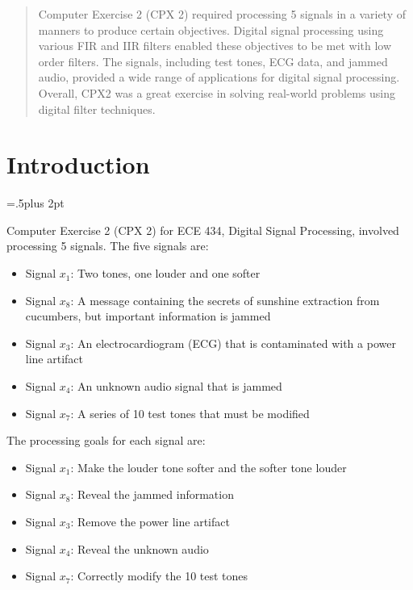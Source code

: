 

\begin{abstract}

Computer Exercise 2 (CPX 2) required processing 5 signals in a variety of manners to produce certain objectives.  Digital signal processing using various FIR and IIR  filters enabled these objectives to be met with low order filters.  The signals, including test tones, ECG data, and jammed audio, provided a wide range of applications for digital signal processing.  Overall, CPX2 was a great exercise in solving real-world problems using digital filter techniques. 

\end{abstract}

\section{Introduction}

\parindent=0pt
\parskip=.5\baselineskip plus 2pt

Computer Exercise 2 (CPX 2) for ECE 434, Digital Signal Processing, involved processing 5 signals.  The five signals are: 
\begin{itemize}
    \item Signal $x_1$: Two tones, one louder and one softer

    \item Signal $x_8$: A message containing the secrets of sunshine extraction from cucumbers, but important information is jammed

    \item Signal $x_3$: An electrocardiogram (ECG) that is contaminated with a power line artifact

    \item Signal $x_4$: An unknown audio signal that is jammed

    \item Signal $x_7$: A series of 10 test tones that must be modified
\end{itemize}

The processing goals for each signal are:
\begin{itemize}
    \item Signal $x_1$: Make the louder tone softer and the softer tone louder

    \item Signal $x_8$: Reveal the jammed information

    \item Signal $x_3$: Remove the power line artifact

    \item Signal $x_4$: Reveal the unknown audio

    \item Signal $x_7$: Correctly modify the 10 test tones
\end{itemize}


